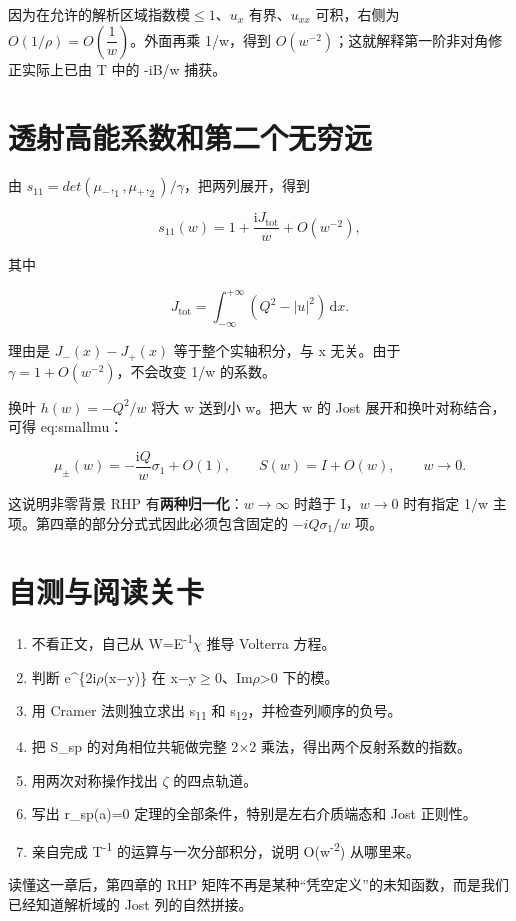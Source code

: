 因为在允许的解析区域指数模$\le{}1$、$u_{x}$ 有界、$u_{xx}$ 可积，右侧为 $O(1/\rho{})=O(\dfrac{1}{w})$。外面再乘 1/w，得到 $O(w^{-2})$；这就解释第一阶非对角修正实际上已由 T 中的 -iB/w 捕获。\par

\section{透射高能系数和第二个无穷远}

由 $s_{11}=det(\mu{}_{-},_{1},\mu{}_{+},_{2})/\gamma{}$，把两列展开，得到\par

\[
s_{11}(w)=1+\dfrac{\mathrm{i}J_{\mathrm{tot}}}{w}
+O(w^{-2}),
\]

其中\par

\[
J_{\mathrm{tot}}=
\int_{-\infty}^{+\infty}(Q^2-|u|^2)\,\mathrm{d}x.
\]

理由是 $J_{-}(x)-J_{+}(x)$ 等于整个实轴积分，与 x 无关。由于 $\gamma{}=1+O(w^{-2})$，不会改变 1/w 的系数。\par

换叶 $h(w)=-Q^{2}/w$ 将大 w 送到小 w。把大 w 的 Jost 展开和换叶对称结合，可得 eq:smallmu：\par

\[
\mu_\pm(w)=-\dfrac{\mathrm{i}Q}{w}\sigma_1+O(1),
\qquad
S(w)=I+O(w),\qquad w\to0.
\]

这说明非零背景 RHP 有\textbf{两种归一化}：$w\to{}\infty{}$ 时趋于 I，$w\to{}0$ 时有指定 1/w 主项。第四章的部分分式式因此必须包含固定的 $-iQ\sigma{}_{1}/w$ 项。\par

\section{自测与阅读关卡}

\begin{enumerate}[leftmargin=2em]
\item 不看正文，自己从 W=E\textsuperscript{-}\textsuperscript{1}\ensuremath{\chi} 推导 Volterra 方程。
\item 判断 e\textasciicircum{}\{2i\ensuremath{\rho}(x\ensuremath{-}y)\} 在 x\ensuremath{-}y\ensuremath{\ge}0、Im\ensuremath{\rho}>0 下的模。
\item 用 Cramer 法则独立求出 s\textsubscript{1}\textsubscript{1} 和 s\textsubscript{1}\textsubscript{2}，并检查列顺序的负号。
\item 把 S\_sp 的对角相位共轭做完整 2\ensuremath{\times}2 乘法，得出两个反射系数的指数。
\item 用两次对称操作找出 \ensuremath{\zeta} 的四点轨道。
\item 写出 r\_sp(a)=0 定理的全部条件，特别是左右介质端态和 Jost 正则性。
\item 亲自完成 T\textsuperscript{-}\textsuperscript{1} 的运算与一次分部积分，说明 O(w\textsuperscript{-}\textsuperscript{2}) 从哪里来。
\end{enumerate}

读懂这一章后，第四章的 RHP 矩阵不再是某种“凭空定义”的未知函数，而是我们已经知道解析域的 Jost 列的自然拼接。\par

